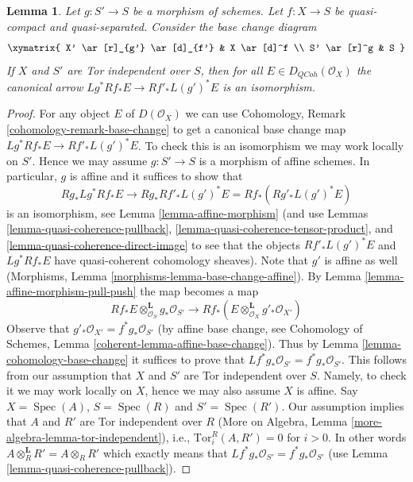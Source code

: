 \documentclass{stacks-project}
\theoremstyle{plain}
\newtheorem{lemma}[subsection]{Lemma}
\theoremstyle{definition}
\theoremstyle{remark}
\numberwithin{equation}{subsection}
\def\Spec{\mathop{\mathrm{Spec}}}
\def\QCoh{\mathit{QCoh}}
\begin{document}
\begin{lemma}
\label{lemma-compare-base-change}
Let $g : S' \to S$ be a morphism of schemes.
Let $f : X \to S$ be quasi-compact and quasi-separated.
Consider the base change diagram
$$
\xymatrix{
X' \ar[r]_{g'} \ar[d]_{f'} &
X \ar[d]^f \\
S' \ar[r]^g &
S
}
$$
If $X$ and $S'$ are Tor independent over $S$, then for all
$E \in D_\QCoh(\mathcal{O}_X)$ the canonical arrow
$Lg^*Rf_*E \to Rf'_*L(g')^*E$ is an isomorphism.
\end{lemma}

\begin{proof}
For any object $E$ of $D(\mathcal{O}_X)$ we can use
Cohomology, Remark \ref{cohomology-remark-base-change} to get a
canonical base change map $Lg^*Rf_*E \to Rf'_*L(g')^*E$. To check this
is an isomorphism we may work locally on $S'$. Hence we may assume
$g : S' \to S$ is a morphism of affine schemes. In particular, $g$
is affine and it suffices to show that
$$
Rg_*Lg^*Rf_*E \to Rg_*Rf'_*L(g')^*E = Rf_*(Rg'_* L(g')^* E)
$$
is an isomorphism, see Lemma \ref{lemma-affine-morphism}
(and use Lemmas \ref{lemma-quasi-coherence-pullback},
\ref{lemma-quasi-coherence-tensor-product}, and
\ref{lemma-quasi-coherence-direct-image}
to see that the objects $Rf'_*L(g')^*E$ and $Lg^*Rf_*E$
have quasi-coherent cohomology sheaves). Note that $g'$ is
affine as well (Morphisms, Lemma \ref{morphisms-lemma-base-change-affine}).
By Lemma \ref{lemma-affine-morphism-pull-push} the map becomes a map
$$
Rf_*E \otimes_{\mathcal{O}_S}^\mathbf{L} g_*\mathcal{O}_{S'}
\longrightarrow
Rf_*(E \otimes_{\mathcal{O}_X}^\mathbf{L} g'_*\mathcal{O}_{X'})
$$
Observe that $g'_*\mathcal{O}_{X'} = f^*g_*\mathcal{O}_{S'}$ (by affine
base change, see Cohomology of Schemes, Lemma
\ref{coherent-lemma-affine-base-change}).
Thus by
Lemma \ref{lemma-cohomology-base-change} it suffices to prove that
$Lf^*g_*\mathcal{O}_{S'} = f^*g_*\mathcal{O}_{S'}$. This follows from our
assumption that $X$ and $S'$ are Tor independent over $S$. Namely, to
check it we may work locally on $X$, hence we may also assume $X$ is affine.
Say $X = \Spec(A)$, $S = \Spec(R)$ and $S' = \Spec(R')$. Our assumption
implies that $A$ and $R'$ are Tor independent over $R$
(More on Algebra, Lemma \ref{more-algebra-lemma-tor-independent}), i.e.,
$\text{Tor}_i^R(A, R') = 0$ for $i > 0$. In other words
$A \otimes_R^\mathbf{L} R' = A \otimes_R R'$ which exactly means
that $Lf^*g_*\mathcal{O}_{S'} = f^*g_*\mathcal{O}_{S'}$
(use Lemma \ref{lemma-quasi-coherence-pullback}).
\end{proof}
\end{document}
